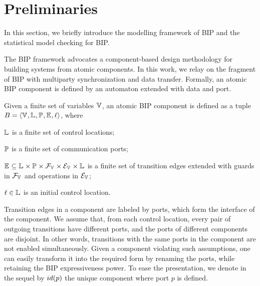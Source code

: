 

\section{Preliminaries}


In this section, we briefly introduce the modelling framework of BIP and the statistical model checking for BIP.

The BIP framework \cite{bip11,atva15,concur16} advocates a component-based design methodology for building systems from atomic components. 
 In this work, we relay on the fragment of BIP with multiparty synchronization and data transfer.
 Formally, an atomic BIP component is defined by an automaton extended with data and port.

\begin{definition} 
	\label{component-def}
	Given a finite set of variables $\mathbb{V}_{}$, 
    an atomic BIP component is defined as a tuple $B_{} = \langle{\ensuremath{\mathbb{V}_{}}, \ensuremath{\mathbb{L}_{}}, \ensuremath{\mathbb{P}_{}}, \ensuremath{\mathbb{E}_{}}, \ell}\rangle$, 
    where
	\begin{inparaenum}
		\item $\mathbb{L}_{}$ is a finite set of control locations;
		\item $\mathbb{P}_{}$ is a finite set of communication ports;
		\item $\mathbb{E}_{} \subseteq \mathbb{L}_{} \times \mathbb{P}_{} \times \mathcal{F}_{\mathbb{V}_{}} \times \mathcal{E}_{\mathbb{V}_{}} \times \mathbb{L}_{}$
		is a finite set of transition edges extended with guards in $\mathcal{F}_{\mathbb{V}_{}}$
		and operations in $\mathcal{E}_{\mathbb{V}_{}}$;
		\item $\ell \in \mathbb{L}_{}$ is an initial control location.
	\end{inparaenum}
\end{definition}

Transition edges in a component are labeled by ports, which form the interface of the component.
We assume that, from each control location, every pair of outgoing transitions have different ports, and the ports of different components are disjoint.
In other words, transitions with the same ports in the component are not enabled simultaneously.
 Given a component violating such assumptions, one can easily transform it into the required form by renaming the ports, while retaining the BIP expressiveness power.
 To ease the presentation, we denote in the sequel by ${id({p})}$ the unique component where port $p$ is defined.


